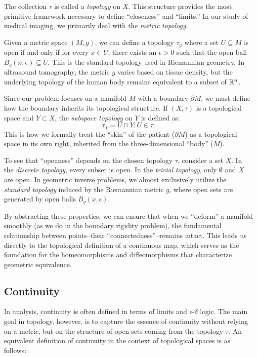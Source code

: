 The collection $\tau$ is called a \emph{topology} on $X$. This structure provides the most primitive framework necessary to define ``closeness'' and ``limits.'' In our study of medical imaging, we primarily deal with the \emph{metric topology}.

\begin{example}
  Given a metric space $(M, g)$, we can define a topology $\tau_g$ where a set $U \subseteq M$ is open if and only if for every $x \in U$, there exists an $\epsilon > 0$ such that the open ball $B_g(x, \epsilon) \subseteq U$. This is the standard topology used in Riemannian geometry. In ultrasound tomography, the metric $g$ varies based on tissue density, but the underlying topology of the human body remains equivalent to a subset of $\mathbb{R}^n$.
\end{example}

\begin{example}
  Since our problem focuses on a manifold $M$ with a boundary $\partial M$, we must define how the boundary inherits its topological structure. If $(X, \tau)$ is a topological space and $Y \subset X$, the \emph{subspace topology} on $Y$ is defined as:
  \[%
    \tau_Y = { U \cap Y : U \in \tau }
  .\]%
  This is how we formally treat the ``skin'' of the patient ($\partial M$) as a topological space in its own right, inherited from the three-dimensional ``body'' ($M$).
\end{example}

\begin{example}
  To see that ``openness'' depends on the chosen topology $\tau$, consider a set $X$. In the \emph{discrete topology}, every subset is open. In the \emph{trivial topology}, only $\emptyset$ and $X$ are open. In geometric inverse problems, we almost exclusively utilize the \emph{standard topology} induced by the Riemannian metric $g$, where open sets are generated by open balls $B_g(x, \epsilon)$.
\end{example}

By abstracting these properties, we can ensure that when we ``deform'' a manifold smoothly (as we do in the boundary rigidity problem), the fundamental relationship between points--their ``connectedness''--remains intact. This leads us directly to the topological definition of a continuous map, which serves as the foundation for the homeomorphisms and diffeomorphisms that characterize geometric equivalence.

\subsection{Continuity} In analysis, continuity is often defined in terms of limits and $\epsilon$-$\delta$ logic. The main goal in topology, however, is to capture the essence of continuity without relying on a metric, but on the structure of open sets coming from the topology $\tau$. An equivalent definition of continuity in the context of topological spaces is as follows:

